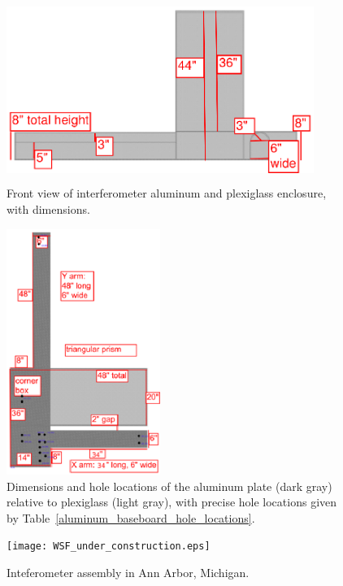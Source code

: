         \begin{figure}
        \begin{center}
        \includegraphics[height=60mm, width=100mm]{view-front.eps}
        \caption{Front view of interferometer aluminum and plexiglass enclosure, with dimensions.}
        \label{plex-view-front}
        \end{center}
        \end{figure}



        \begin{figure}
        \begin{center}
        \includegraphics[height=80mm, width=50mm]{view-top-plate-3.eps}
        \caption{Dimensions and hole locations of the aluminum plate (dark gray) relative to plexiglass (light gray), with precise hole locations given by Table~\ref{aluminum_baseboard_hole_locations}.}
        \label{al_top_plate}
        \end{center}
        \end{figure}


	\begin{figure}
	\begin{center}
	\texttt{[image: WSF\_under\_construction.eps]}
	\caption{Inteferometer assembly in Ann Arbor, Michigan.}
	\label{WSF_in_AA}
	\end{center}
	\end{figure}

